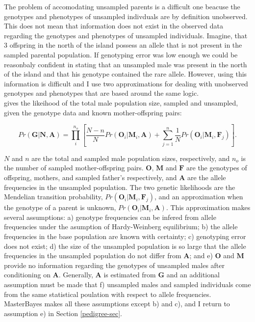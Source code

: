 \documentclass{article}
\begin{document}
The problem of accomodating unsampled parents is a difficult one beacuse the genotypes and phenotypes of unsampled indivduals are by definition unobserved. This does not mean that information does not exist in the observed data regarding the genotypes and phenotypes of unsampled individuals.  Imagine, that 3 offspring in the north of the island possess an allele that is not present in the sampled parental population. If genotyping error was low enough we could be reasonbaly confident in stating that an unsampled male was present in the north of the island and that his genotype contained the rare allele.  However, using this information is difficult and I use two approximations for dealing with unobserved genotypes and phenotypes that are based around the same logic.\\

\citet{Nielsen.2001} gives the likeihood of the total male population size, sampled and unsampled, given the genotype data and known mother-offspring pairs:

\begin{equation} 
Pr(\bm{G}|\bm{N}, \bm{A}) = \prod^{n_{o}}_{i}\left[\frac{N-n}{N}Pr(\bm{O}_{i}|\bm{M}_{i}, \bm{A}) + \sum_{j=1}^{n}\frac{1}{N}Pr(\bm{O}_{i}|\bm{M}_{i}, \bm{F}_{j})\right].
\label{Nielsen-eq}
\end{equation} 

$N$ and $n$ are the total and sampled male population sizes, respectively, and $n_{o}$ is the number of sampled mother-offspring pairs.  $\bm{O}$, $\bm{M}$ and $\bm{F}$ are the genotypes of offspring, mothers, and sampled father's respectively, and $\bm{A}$ are the allele frequencies in the unsampled population. The two genetic likelihoods are the Mendelian transition probability, $Pr(\bm{O}_{i}|\bm{M}_{i}, \bm{F}_{j})$, and an approximation when the genotype of a parent is unknown, $Pr(\bm{O}_{i}|\bm{M}_{i}, \bm{A})$.  This approximation makes several assumptions: a) genotype frequencies can be infered from allele frequencies under the asumption of Hardy-Weinberg equilibrium; b) the allele frequencies in the base population are known with certainty; c) genotyping error does not exist; d) the size of the unsampled population is so large that the allele frequencies in the unsampled population do not differ from $\bm{A}$; and e) $\bm{O}$ and $\bm{M}$ provide no information regarding the genotypes of unsampled males after conditioning on $\bm{A}$. Generally, $\bm{A}$ is estimated from $\bm{G}$ and an additional assumption must be made that f) unsampled males and sampled individuals come from the same statistical poulation with respect to allele frequencies.  MasterBayes makes all these assumptions except b) and c), and I return to assumption e) in Section \ref{pedigree-sec}.\\ 
\end{document}
